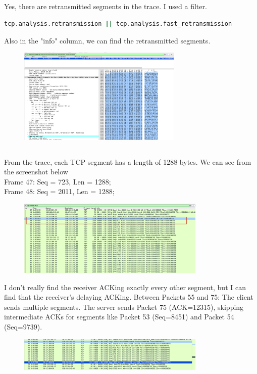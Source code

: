 \documentclass{article}
\begin{document}
\begin{CJK*}{UTF8}{gbsn}
\subsection{}
Yes, there are retransmitted segments in the trace.
I used a filter.
\begin{lstlisting}[language=bash]
    tcp.analysis.retransmission || tcp.analysis.fast_retransmission
\end{lstlisting}
Also in the "info" column, we can find the retransmitted segments.
\begin{figure}[H]
    \centering
    \includegraphics[width=0.7\textwidth]{10-1.png}
\end{figure}

\subsection{}
From the trace, each TCP segment has a length of 1288 bytes.
We can see from the screenshot below\\
Frame 47: Seq = 723, Len = 1288;\\
Frame 48: Seq = 2011, Len = 1288;\\
\begin{figure}[H]
    \centering
    \includegraphics[width=0.8\textwidth]{11-1.png}
\end{figure}
I don't really find the receiver ACKing exactly every other segment,
but I can find that the receiver's delaying ACKing.
Between Packets 55 and 75:
The client sends multiple segments. The server sends Packet 75 (ACK=12315), skipping intermediate ACKs for segments like Packet 53 (Seq=8451) and Packet 54 (Seq=9739).
\begin{figure}[H]
    \centering
    \includegraphics[width=0.8\textwidth]{11-2.png}
\end{figure}

\end{CJK*}
\end{document}
